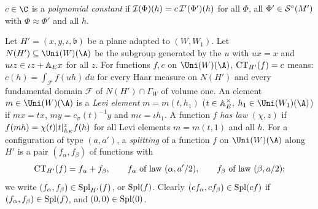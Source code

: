 \begin{definition}\label{pf:thmK:def:polconst}
$c\in\C$ is a \emph{polynomial constant} if $\mathcal{I}(\Phi)(h)=c\,\mathcal{I}'(\Phi')(h)$ for all $\Phi$, all
$\Phi'\in\mathcal{S}^{\circ}(M')$ with $\Phi\approx\Phi'$ and all $h$.
\end{definition}

\begin{definition}\label{pf:thmK:def:ct}
Let $H'=(x,y,\iota,\mathfrak b)$ be a plane adapted to $(W,W_1)$. Let $N(H')\subseteq\Uni(W)(\A)$ be the subgroup
generated by the $u$ with $ux=x$ and $u\iota z\in\iota z+\mathbb{A}_E x$ for all $z$. For functions $f,c$ on $\Uni(W)(\A)$,
$\operatorname{CT}_{H'}(f)=c$ means: $c(h)=\int_{\mathcal F}f(uh)\,du$ for every Haar measure on $N(H')$ and every fundamental
domain $\mathcal F$ of $N(H')\cap\Gamma_W$ of volume one. An element $m\in\Uni(W)(\A)$ is a \emph{Levi element}
$m=m(t,h_1)$ ($t\in\mathbb{A}_E^\times$, $h_1\in\Uni(W_1)(\A)$) if $mx=tx$, $my=c_\sigma(t)^{-1}y$ and $m\iota=\iota h_1$. A
function $f$ \emph{has law} $(\chi,z)$ if $f(mh)=\chi(t)|t|_{\mathbb{A}_E}^zf(h)$ for all Levi elements $m=m(t,1)$ and all
$h$. For a configuration of type $(a,a')$, a \emph{splitting} of a function $f$ on $\Uni(W)(\A)$ along $H'$ is a pair
$(f_\alpha,f_\beta)$ of functions with
\begin{equation}\label{pf:thmK:eq:split2}
\operatorname{CT}_{H'}(f)=f_\alpha+f_\beta,\qquad f_\alpha\text{ of law }(\alpha,a'/2),\qquad f_\beta\text{ of law }(\beta,a/2);
\end{equation}
we write $(f_\alpha,f_\beta)\in\operatorname{Spl}_{H'}(f)$, or $\operatorname{Spl}(f)$. Clearly $(cf_\alpha,cf_\beta)\in\operatorname{Spl}(cf)$ if
$(f_\alpha,f_\beta)\in\operatorname{Spl}(f)$, and $(0,0)\in\operatorname{Spl}(0)$.
\end{definition}

